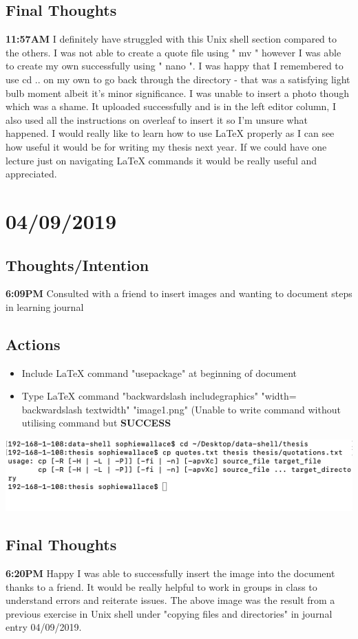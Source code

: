 \documentclass{article}
\begin{document}
\subsection{Final Thoughts}
\textbf{11:57AM} I definitely have struggled with this Unix shell section compared to the others. I was not able to create a quote file using " mv " however I was able to create my own successfully using " nano ". I was happy that I remembered to use cd .. on my own to go back through the directory - that was a satisfying light bulb moment albeit it's minor significance. I was unable to insert a photo though which was a shame. It uploaded successfully and is in the left editor column, I also used all the instructions on overleaf to insert it so I'm unsure what happened. I would really like to learn how to use LaTeX properly as I can see how useful it would be for writing my thesis next year. If we could have one lecture just on navigating LaTeX commands it would be really useful and appreciated. 




\section{04/09/2019}
\subsection{Thoughts/Intention}
\textbf{6:09PM} Consulted with a friend to insert images and wanting to document steps in learning journal

\subsection{Actions}
\begin{itemize}
\item Include LaTeX command "usepackage" at beginning of document 
\item Type LaTeX command "backwardslash includegraphics" "width= backwardslash textwidth" "image1.png" (Unable to write command without utilising command but \textbf{SUCCESS}
\end{itemize}


\includegraphics[width=\textwidth]{image1.png}

\subsection{Final Thoughts}
\textbf{6:20PM} Happy I was able to successfully insert the image into the document thanks to a friend. It would be really helpful to work in groups in class to understand errors and reiterate issues. The above image was the result from a previous exercise in Unix shell under "copying files and directories" in journal entry 04/09/2019. 
\end{document}
